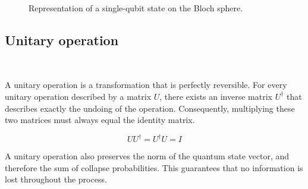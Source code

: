 \begin{figure}[ht]
    \centering
{}
    \caption{Representation of a single-qubit state on the Bloch sphere.}
    \label{fig:blochsphere}
\end{figure}


\subsection{Unitary operation}
~\label{subsec:unitary_operation}

A unitary operation is a transformation that is perfectly reversible. For every unitary operation described by a matrix \(U\), there exists an inverse matrix \(U^\dagger\) that describes exactly the undoing of the operation. Consequently, multiplying these two matrices must always equal the identity matrix.

\begin{equation}
    UU^\dagger=U^\dagger U=I
    \label{eq:unitary_identity}
\end{equation}

A unitary operation also preserves the norm of the quantum state vector, and therefore the sum of collapse probabilities. This guarantees that no information is lost throughout the process.

